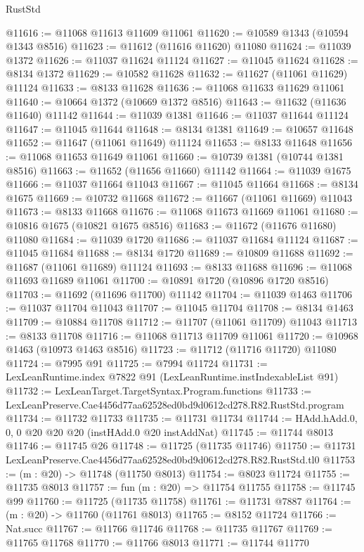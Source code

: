 \begin{lexlean}{RustStd}
\begin{coremodule}
@11616 := @11068 @11613 @11609 @11061
@11620 := @10589 @1343 (@10594 @1343 @8516)
@11623 := @11612 (@11616 @11620) @11080
@11624 := @11039 @1372
@11626 := @11037 @11624 @11124
@11627 := @11045 @11624
@11628 := @8134 @1372
@11629 := @10582 @11628
@11632 := @11627 (@11061 @11629) @11124
@11633 := @8133 @11628
@11636 := @11068 @11633 @11629 @11061
@11640 := @10664 @1372 (@10669 @1372 @8516)
@11643 := @11632 (@11636 @11640) @11142
@11644 := @11039 @1381
@11646 := @11037 @11644 @11124
@11647 := @11045 @11644
@11648 := @8134 @1381
@11649 := @10657 @11648
@11652 := @11647 (@11061 @11649) @11124
@11653 := @8133 @11648
@11656 := @11068 @11653 @11649 @11061
@11660 := @10739 @1381 (@10744 @1381 @8516)
@11663 := @11652 (@11656 @11660) @11142
@11664 := @11039 @1675
@11666 := @11037 @11664 @11043
@11667 := @11045 @11664
@11668 := @8134 @1675
@11669 := @10732 @11668
@11672 := @11667 (@11061 @11669) @11043
@11673 := @8133 @11668
@11676 := @11068 @11673 @11669 @11061
@11680 := @10816 @1675 (@10821 @1675 @8516)
@11683 := @11672 (@11676 @11680) @11080
@11684 := @11039 @1720
@11686 := @11037 @11684 @11124
@11687 := @11045 @11684
@11688 := @8134 @1720
@11689 := @10809 @11688
@11692 := @11687 (@11061 @11689) @11124
@11693 := @8133 @11688
@11696 := @11068 @11693 @11689 @11061
@11700 := @10891 @1720 (@10896 @1720 @8516)
@11703 := @11692 (@11696 @11700) @11142
@11704 := @11039 @1463
@11706 := @11037 @11704 @11043
@11707 := @11045 @11704
@11708 := @8134 @1463
@11709 := @10884 @11708
@11712 := @11707 (@11061 @11709) @11043
@11713 := @8133 @11708
@11716 := @11068 @11713 @11709 @11061
@11720 := @10968 @1463 (@10973 @1463 @8516)
@11723 := @11712 (@11716 @11720) @11080
@11724 := @7995 @91
@11725 := @7994 @11724
@11731 := LexLeanRuntime.index @7822 @91 (LexLeanRuntime.instIndexableList @91)
@11732 := LexLeanTarget.TargetSyntax.Program.functions
@11733 := LexLeanPreserve.Cae4456d77aa62528ed0bd9d0612cd278.R82.RustStd.program
@11734 := @11732 @11733
@11735 := @11731 @11734
@11744 := HAdd.hAdd.{0, 0, 0} @20 @20 @20 (instHAdd.{0} @20 instAddNat)
@11745 := @11744 @8013
@11746 := @11745 @26
@11748 := @11725 (@11735 @11746)
@11750 := @11731 LexLeanPreserve.Cae4456d77aa62528ed0bd9d0612cd278.R82.RustStd.tl0
@11753 := (m : @20) -> @11748 (@11750 @8013)
@11754 := @8023 @11724
@11755 := @11735 @8013
@11757 := fun (m : @20) => @11754 @11755
@11758 := @11745 @99
@11760 := @11725 (@11735 @11758)
@11761 := @11731 @7887
@11764 := (m : @20) -> @11760 (@11761 @8013)
@11765 := @8152 @11724
@11766 := Nat.succ
@11767 := @11766 @11746
@11768 := @11735 @11767
@11769 := @11765 @11768
@11770 := @11766 @8013
@11771 := @11744 @11770

\end{coremodule}
\end{lexlean}
